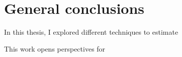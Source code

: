 
\chapter*{General conclusions}

In this thesis, I explored different techniques to estimate

\begin{center}
\end{center}

This work opens perspectives for 

\vfill
\begin{center}
\end{center}
\vfill\vfill
